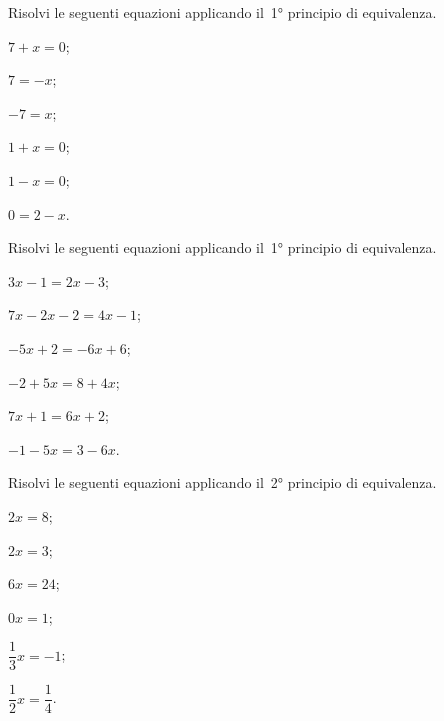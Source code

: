\begin{esercizio}
\label{ese:13.4}
Risolvi le seguenti equazioni applicando il~1° principio di equivalenza.
\begin{multicols}{3}
\begin{enumeratea}
\spazielenx
 \item $7+x=0$;
 \item $7=-x$;
 \item $-7=x$;
 \item $1+x=0$;
 \item $1-x=0$;
 \item $0=2-x$.
\end{enumeratea}
\end{multicols}
\end{esercizio}

\begin{esercizio}
\label{ese:13.5}
Risolvi le seguenti equazioni applicando il~1° principio di equivalenza.
\begin{multicols}{3}
\begin{enumeratea}
\spazielenx
 \item $3x-1=2x-3$;
 \item $7x-2x-2=4x-1$;
 \item $-5x+2=-6x+6$;
 \item $-2+5x=8+4x$;
 \item $7x+1=6x+2$;
 \item $-1-5x=3-6x$.
\end{enumeratea}
\end{multicols}
\end{esercizio}


\begin{esercizio}
\label{ese:13.6}
Risolvi le seguenti equazioni applicando il~2° principio di equivalenza.
\begin{multicols}{3}
\begin{enumeratea}
\spazielenx
 \item $2x=8$;
 \item $2x=3$;
 \item $6x=24$;
 \item $0x=1$;
 \item $\dfrac{1}{3}x=-1$;
 \item $\dfrac{1}{2}x=\dfrac{1}{4}$.
\end{enumeratea}
\end{multicols}
\end{esercizio}

